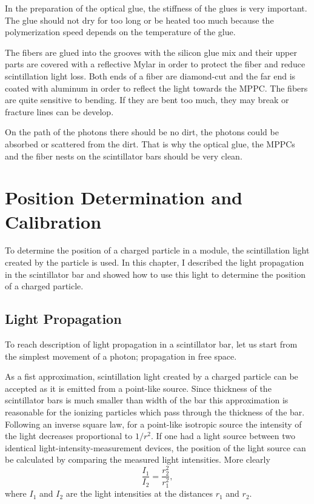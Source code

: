 \documentclass[a4paper]{article}\linespread{1.4}
\begin{document}
In the preparation of the optical glue, the stiffness of the glues is very important. The glue should not dry for too long or be heated too much because the polymerization speed depends on the temperature of the glue.

The fibers are glued into the grooves with the silicon glue mix and their upper parts are covered with a reflective Mylar in order to protect the fiber and reduce scintillation light loss. Both ends of a fiber are diamond-cut and the far end is coated with aluminum in order to reflect the light towards the MPPC. 
The fibers are quite sensitive to bending. If they are bent too much, they may break or fracture lines can be develop.

On the path of the photons there should be no dirt, the photons could be absorbed or scattered from the dirt. That is why the optical glue, the MPPCs and the fiber nests on the scintillator bars should be very clean.
\clearpage

\section{Position Determination and Calibration}
\label{chap:pdc}
To determine the position of a charged particle in a module, the scintillation light created by the particle is used. 
In this chapter, I described the light propagation in the scintillator bar and showed how to use this light to determine the position of a charged particle.

\subsection{Light Propagation}
\label{chap:lightpro}
To reach description of light propagation in a scintillator bar, let us start from the simplest movement of a photon; propagation in free space.

As a fist approximation, scintillation light created by a charged particle can be accepted as it is emitted from a point-like source. Since thickness of the scintillator bars is much smaller than width of the bar this approximation is reasonable for the ionizing particles which pass through the thickness of the bar. Following an inverse square law, for a point-like isotropic source the intensity of the light decreases proportional to $1/r^{2}$. If one had a light source between two identical light-intensity-measurement devices, the position of the light source can be calculated by comparing the measured light intensities. More clearly 
\begin{equation} \frac{I_{1}}{I_{2}} = \frac{r_{2}^{2}}{r_{1}^{2}}, \label{eq:1bu}\end{equation}
where $I_{1}$ and $I_{2}$ are the light intensities at the distances $r_{1}$ and $r_{2}$.
\end{document}
